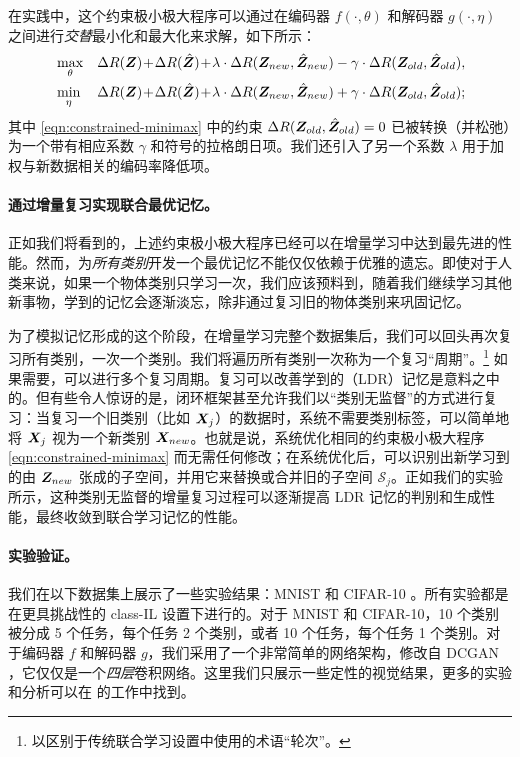 \documentclass[../../book-main.tex]{subfiles}
\begin{document}
在实践中，这个约束极小极大程序可以通过在编码器 $f(\cdot, \theta)$ 和解码器 $g(\cdot, \eta)$ 之间进行{\em 交替}最小化和最大化来求解，如下所示：
\begin{eqnarray}
&\max_\theta  &\Delta{R(\Z)}\!+\!\Delta{R(\hat{\Z})}\!+\!\lambda\cdot  \Delta{R(\Z_{new},\hat{\Z}_{new})} - \gamma\cdot \Delta{R(\Z_{old},\hat{\Z}_{old})}, \label{eqn:relaxed-max}\\ 
&\min_\eta &\Delta{R(\Z)}\!+\!\Delta{R(\hat{\Z})}\!+\!\lambda\cdot \Delta{R(\Z_{new},\hat{\Z}_{new})} + \gamma\cdot \Delta{R(\Z_{old},\hat{\Z}_{old})}; \label{eqn:relaxed-min}
\end{eqnarray}
其中 \eqref{eqn:constrained-minimax} 中的约束 $\Delta R(\bm{Z}_{old},\hat{\bm{Z}}_{old}) = 0$ 已被转换（并松弛）为一个带有相应系数 $\gamma$ 和符号的拉格朗日项。我们还引入了另一个系数 $\lambda$ 用于加权与新数据相关的编码率降低项。%



\paragraph{通过增量复习实现联合最优记忆。} 
正如我们将看到的，上述约束极小极大程序已经可以在增量学习中达到最先进的性能。然而，为{\em 所有类别}开发一个最优记忆不能仅仅依赖于优雅的遗忘。即使对于人类来说，如果一个物体类别只学习一次，我们应该预料到，随着我们继续学习其他新事物，学到的记忆会逐渐淡忘，除非通过复习旧的物体类别来巩固记忆。

为了模拟记忆形成的这个阶段，在增量学习完整个数据集后，我们可以回头再次复习所有类别，一次一个类别。我们将遍历所有类别一次称为一个复习“周期”。\footnote{以区别于传统联合学习设置中使用的术语“轮次”。} 如果需要，可以进行多个复习周期。复习可以改善学到的（LDR）记忆是意料之中的。但有些令人惊讶的是，闭环框架甚至允许我们以“{类别无监督}”的方式进行复习：当复习一个旧类别（比如 $\bm{X}_j$）的数据时，系统不需要类别标签，可以简单地将 $\bm{X}_j$ 视为一个新类别 $\bm{X}_{new}$。也就是说，系统优化相同的约束极小极大程序 \eqref{eqn:constrained-minimax} 而无需任何修改；在系统优化后，可以识别出新学习到的由 $\bm{Z}_{new}$ 张成的子空间，并用它来替换或合并旧的子空间 $\mathcal{S}_j$。正如我们的实验所示，这种类别无监督的增量复习过程可以逐渐提高 LDR 记忆的判别和生成性能，最终收敛到联合学习记忆的性能。

\paragraph{实验验证。}
我们在以下数据集上展示了一些实验结果：MNIST \cite{lecun1998gradient} 和 CIFAR-10 \cite{krizhevsky2014cifar}。所有实验都是在更具挑战性的 class-IL 设置下进行的。对于 MNIST 和 CIFAR-10，10 个类别被分成 5 个任务，每个任务 2 个类别，或者 10 个任务，每个任务 1 个类别。对于编码器 $f$ 和解码器 $g$，我们采用了一个非常简单的网络架构，修改自 DCGAN \cite{radford2016unsupervised}，它仅仅是一个{\em 四层}卷积网络。这里我们只展示一些定性的视觉结果，更多的实验和分析可以在 \cite{tong2023incremental} 的工作中找到。
\end{document}
